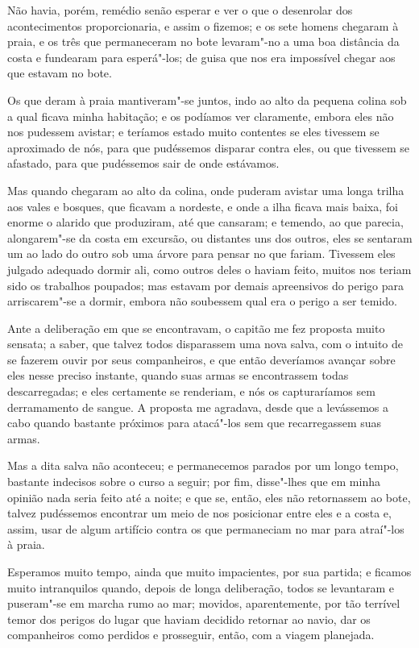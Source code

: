 Não havia, porém, remédio senão esperar e ver o que o desenrolar dos
acontecimentos proporcionaria, e assim o fizemos; e os sete homens
chegaram à praia, e os três que permaneceram no bote levaram"-no a uma
boa distância da costa e fundearam para esperá"-los; de guisa que nos era
impossível chegar aos que estavam no bote.

Os que deram à praia mantiveram"-se juntos, indo ao alto da pequena
colina sob a qual ficava minha habitação; e os podíamos ver claramente,
embora eles não nos pudessem avistar; e teríamos estado muito contentes
se eles tivessem se aproximado de nós, para que pudéssemos disparar
contra eles, ou que tivessem se afastado, para que pudéssemos sair de
onde estávamos.

Mas quando chegaram ao alto da colina, onde puderam avistar uma longa
trilha aos vales e bosques, que ficavam a nordeste, e onde a ilha ficava
mais baixa, foi enorme o alarido que produziram, até que cansaram; e
temendo, ao que parecia, alongarem"-se da costa em excursão, ou distantes
uns dos outros, eles se sentaram um ao lado do outro sob uma árvore para
pensar no que fariam. Tivessem eles julgado adequado dormir ali, como
outros deles o haviam feito, muitos nos teriam sido os trabalhos
poupados; mas estavam por demais apreensivos do perigo para
arriscarem"-se a dormir, embora não soubessem qual era o perigo a ser
temido.

Ante a deliberação em que se encontravam, o capitão me fez proposta
muito sensata; a saber, que talvez todos disparassem uma nova salva, com
o intuito de se fazerem ouvir por seus companheiros, e que então
deveríamos avançar sobre eles nesse preciso instante, quando suas armas
se encontrassem todas descarregadas; e eles certamente se renderiam, e
nós os capturaríamos sem derramamento de sangue. A proposta me agradava,
desde que a levássemos a cabo quando bastante próximos para atacá"-los
sem que recarregassem suas armas.

Mas a dita salva não aconteceu; e permanecemos parados por um longo
tempo, bastante indecisos sobre o curso a seguir; por fim, disse"-lhes
que em minha opinião nada seria feito até a noite; e que se, então, eles
não retornassem ao bote, talvez pudéssemos encontrar um meio de nos
posicionar entre eles e a costa e, assim, usar de algum artifício contra
os que permaneciam no mar para atraí"-los à praia.

Esperamos muito tempo, ainda que muito impacientes, por sua partida; e
ficamos muito intranquilos quando, depois de longa deliberação, todos se
levantaram e puseram"-se em marcha rumo ao mar; movidos, aparentemente,
por tão terrível temor dos perigos do lugar que haviam decidido retornar
ao navio, dar os companheiros como perdidos e prosseguir, então, com a
viagem planejada.

